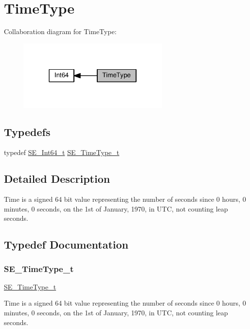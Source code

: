 \hypertarget{group__TimeType}{}\section{Time\+Type}
\label{group__TimeType}
Collaboration diagram for Time\+Type\+:\nopagebreak
\begin{figure}[H]
\begin{center}
\leavevmode
\includegraphics[width=214pt]{group__TimeType}
\end{center}
\end{figure}
\subsection*{Typedefs}
\begin{DoxyCompactItemize}
\item 
typedef \hyperlink{group__Int64_ga946a01895d7edbdd190770677f54f2c6}{S\+E\+\_\+\+Int64\+\_\+t} \hyperlink{group__TimeType_ga6fba87a5b57829b4ff3f0e7638156682}{S\+E\+\_\+\+Time\+Type\+\_\+t}
\end{DoxyCompactItemize}


\subsection{Detailed Description}
Time is a signed 64 bit value representing the number of seconds since 0 hours, 0 minutes, 0 seconds, on the 1st of January, 1970, in U\+TC, not counting leap seconds. 

\subsection{Typedef Documentation}
\mbox{\label{group__TimeType_ga6fba87a5b57829b4ff3f0e7638156682}} 
\subsubsection{\texorpdfstring{S\+E\+\_\+\+Time\+Type\+\_\+t}{SE\_TimeType\_t}}
{\footnotesize\ttfamily \hyperlink{group__TimeType_ga6fba87a5b57829b4ff3f0e7638156682}{S\+E\+\_\+\+Time\+Type\+\_\+t}}

Time is a signed 64 bit value representing the number of seconds since 0 hours, 0 minutes, 0 seconds, on the 1st of January, 1970, in U\+TC, not counting leap seconds. 